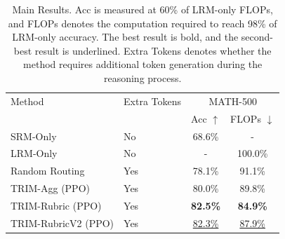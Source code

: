 \begin{table}[t]
\centering
\small
\begin{tabular}{llcc}
\toprule
Method & Extra Tokens & \multicolumn{2}{c}{MATH-500} &  \\
 &  & Acc $\uparrow$ & FLOPs $\downarrow$ \\
\midrule
SRM-Only & No & 68.6\% & - \\
LRM-Only & No & - & 100.0\% \\
Random Routing & Yes & 78.1\% & 91.1\% \\
TRIM-Agg (PPO) & Yes & 80.0\% & 89.8\% \\
TRIM-Rubric (PPO) & Yes & \textbf{82.5\%} & \textbf{84.9\%} \\
TRIM-RubricV2 (PPO) & Yes & \underline{82.3\%} & \underline{87.9\%} \\
\bottomrule
\end{tabular}
\caption{Main Results. Acc is measured at 60\% of LRM-only FLOPs, and FLOPs denotes the computation required to reach 98\% of LRM-only accuracy. The best result is bold, and the second-best result is underlined. Extra Tokens denotes whether the method requires additional token generation during the reasoning process.}
\end{table}
